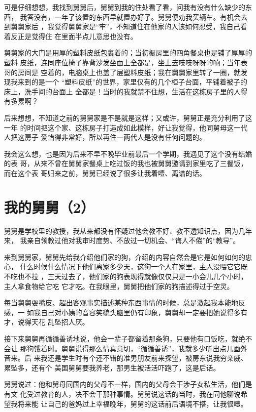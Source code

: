 \documentclass[12pt]{book}
\begin{document}
可是仔细想想，我找到舅舅后，舅舅到我的住处看了看，问我有没有什么缺少的东西，
我答没有，一年了该置的东西早就置办好了。舅舅便劝我买辆车。有机会去到舅舅家后
，我觉得舅舅家是“牢”，不知道住在他家的人该如何忍受，我自己看着反正是觉得住
在里面半点儿意思也没有。

舅舅家的大门是用厚的塑料皮纸包裹着的；当初橱房里的四角餐桌也是铺了厚厚的塑料
皮纸，连同座位椅子靠背沙发坐面上全都是，坐上去吱吱呀呀的响；当年表哥的房间是
空着的，电脑桌上也盖了层塑料皮纸；我在舅舅家里转了一圈，就发现我来到的是一个
“塑料皮纸”的世界，家里仅有的几个柜子台面，平铺着被子的床上，洗手间的台面上
全都是！当时的我就禁不住想，生活在这栋房子里的人得有多累啊？

后来想想，不知道之前的舅舅家是不是就是这样；又或许，舅舅正是充分利用了这一年
的时间把这个家、这栋房子打造成如此模样，好让我觉得，他同舅母这一代人把这房子
爱惜得非常好，所以再住一两代人是没有任何问题的。

我会这么想，也是因为后来不早不晚毕业前最后一个学期，我遇见了这个没有结婚的表
哥，从来不曾在舅舅家餐桌上吃过饭的我也被舅舅邀请到家里吃了三餐饭，而在这个表
哥归来之前，舅舅已经说了很多让我着噎、离谱的话。
\section{我的舅舅（2）}
\label{sec-9-60}

舅舅是学校里的教授，我从来都没有怀疑过他会教不好、教不透知识点，因为几年来，
我亲自领教过他对我审时度势、不放过一切机会、“诲人不倦”的“教导”。

来到舅舅家，舅舅先给我介绍他们家的狗，介绍的内容自然会是它是如何如何的忠心，
什么时候什么情况下他们离家多少天，这狗一个人在家里，主人没喂它它既不吃也不拉
，三天过去了，他们家的狗表现得就像仅仅只是一小会儿几个小时，主人拿食物给它吃
它才吃。在我眼里，舅舅把他们家的狗描述得过于空灵。

每当舅舅耍嘴皮、超出客观事实描述某种东西事情的时候，总是激起我本能地反感，一
如我自己对小姨的音容笑貌头脑里仍有印象，舅舅却一定要把她说得多有才，说得天花
乱坠招人厌。

接下来舅舅再循循善诱地说，他会一辈子都留着那条狗，只要他有口饭吃，就绝不会让
那狗饿着时。舅舅说得那么情真意切，“循循善诱”，我就多少听出点儿画外音来。后
来我还是学生时有个还不错的准男朋友前来探望，被房东说我穷亲威、累坠多，还有个
美国舅舅要我养老，那男生被活活吓跑了，这是后话。

舅舅说过：他和舅母同国内的父母不一样，国内的父母会干涉子女私生活，他们是有文
化受过教育的人，决不会干那种事情。舅舅说这话的当时，我在同他聊说希望我将来能
让自己的爸妈过上幸福晚年，舅舅的这话前后语境不搭，让我很噎。
\end{document}
